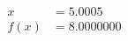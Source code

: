 \documentclass[preview]{standalone}
\begin{document}
\begin{align*}
x &= 5.0005\\f(x) &= 8.0000000
\end{align*}
\end{document}

